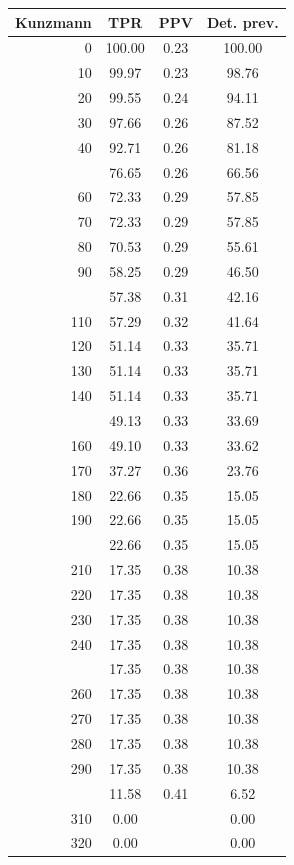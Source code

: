 \documentclass[12pt]{article}
\begin{document}
\begin{minipage}{0.5\textwidth}\small
\begin{tabular}{rccc}
\toprule
\textbf{Kunzmann} & \textbf{TPR} 
& \textbf{PPV} & \textbf{Det. prev.} \\
\midrule 
0 & 100.00 & 0.23 & 100.00 \\ 
  10 & 99.97 & 0.23 & 98.76 \\ 
  20 & 99.55 & 0.24 & 94.11 \\ 
  30 & 97.66 & 0.26 & 87.52 \\ 
  40 & 92.71 & 0.26 & 81.18 \\ \addlinespace 
  50 & 76.65 & 0.26 & 66.56 \\ 
  60 & 72.33 & 0.29 & 57.85 \\ 
  70 & 72.33 & 0.29 & 57.85 \\ 
  80 & 70.53 & 0.29 & 55.61 \\ 
  90 & 58.25 & 0.29 & 46.50 \\  \addlinespace
  100 & 57.38 & 0.31 & 42.16 \\ 
  110 & 57.29 & 0.32 & 41.64 \\ 
  120 & 51.14 & 0.33 & 35.71 \\ 
  130 & 51.14 & 0.33 & 35.71 \\ 
  140 & 51.14 & 0.33 & 35.71 \\  \addlinespace
  150 & 49.13 & 0.33 & 33.69 \\ 
  160 & 49.10 & 0.33 & 33.62 \\ 
  170 & 37.27 & 0.36 & 23.76 \\ 
  180 & 22.66 & 0.35 & 15.05 \\ 
  190 & 22.66 & 0.35 & 15.05 \\  \addlinespace
  200 & 22.66 & 0.35 & 15.05 \\ 
  210 & 17.35 & 0.38 & 10.38 \\ 
  220 & 17.35 & 0.38 & 10.38 \\ 
  230 & 17.35 & 0.38 & 10.38 \\ 
  240 & 17.35 & 0.38 & 10.38 \\  \addlinespace
  250 & 17.35 & 0.38 & 10.38 \\ 
  260 & 17.35 & 0.38 & 10.38 \\ 
  270 & 17.35 & 0.38 & 10.38 \\ 
  280 & 17.35 & 0.38 & 10.38 \\ 
  290 & 17.35 & 0.38 & 10.38 \\  \addlinespace
  300 & 11.58 & 0.41 & 6.52 \\ 
  310 & 0.00 &  & 0.00 \\ 
  320 & 0.00 &  & 0.00 \\ 
\bottomrule
\end{tabular}
\end{minipage}
\end{document}
